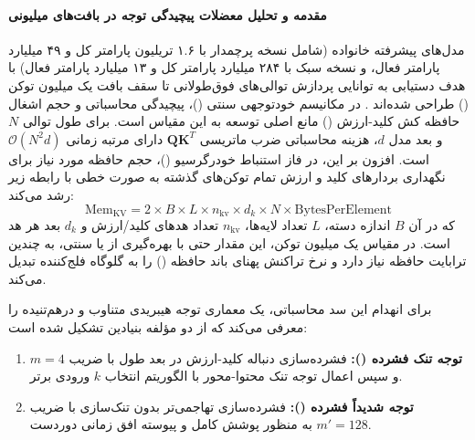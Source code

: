 \item {}

\paragraph*{مقدمه و تحلیل معضلات پیچیدگی توجه در بافت‌های میلیونی}
مدل‌های پیشرفته خانواده  (شامل نسخه پرچمدار  با ۱.۶ تریلیون پارامتر کل و ۴۹ میلیارد پارامتر فعال، و نسخه سبک  با ۲۸۴ میلیارد پارامتر کل و ۱۳ میلیارد پارامتر فعال) با هدف دستیابی به توانایی پردازش توالی‌های فوق‌طولانی تا سقف بافت یک میلیون توکن () طراحی شده‌اند \cite{deepseek2026v4}. در مکانیسم خود‌توجهی سنتی ()، پیچیدگی محاسباتی و حجم اشغال حافظه کش کلید-ارزش () مانع اصلی توسعه به این مقیاس است. برای طول توالی $N$ و بعد مدل $d$، هزینه محاسباتی ضرب ماتریسی $\mathbf{Q}\mathbf{K}^T$ دارای مرتبه زمانی $\mathcal{O}(N^2 d)$ است. افزون بر این، در فاز استنباط خودرگرسیو ()، حجم حافظه مورد نیاز برای نگهداری بردارهای کلید و ارزش تمام توکن‌های گذشته به صورت خطی با رابطه زیر رشد می‌کند:
\begin{equation}
    \text{Mem}_{\text{KV}} = 2 \times B \times L \times n_{\text{kv}} \times d_k \times N \times \text{BytesPerElement}
\end{equation}
که در آن $B$ اندازه دسته، $L$ تعداد لایه‌ها، $n_{\text{kv}}$ تعداد هدهای کلید/ارزش و $d_k$ بعد هر هد است. در مقیاس یک میلیون توکن، این مقدار حتی با بهره‌گیری از  یا  سنتی، به چندین ترابایت حافظه  نیاز دارد و نرخ تراکنش پهنای باند حافظه () را به گلوگاه فلج‌کننده تبدیل می‌کند.

برای انهدام این سد محاسباتی،  یک معماری توجه هیبریدی متناوب و درهم‌تنیده را معرفی می‌کند که از دو مؤلفه بنیادین تشکیل شده است:
\begin{enumerate}
    \item \textbf{توجه تنک فشرده ():} فشرده‌سازی دنباله کلید-ارزش در بعد طول با ضریب $m=4$ و سپس اعمال توجه تنک محتوا-محور با الگوریتم انتخاب $k$ ورودی برتر.
    \item \textbf{توجه شدیداً فشرده ():} فشرده‌سازی تهاجمی‌تر بدون تنک‌سازی با ضریب $m'=128$ به منظور پوشش کامل و پیوسته افق زمانی دوردست.
\end{enumerate}

